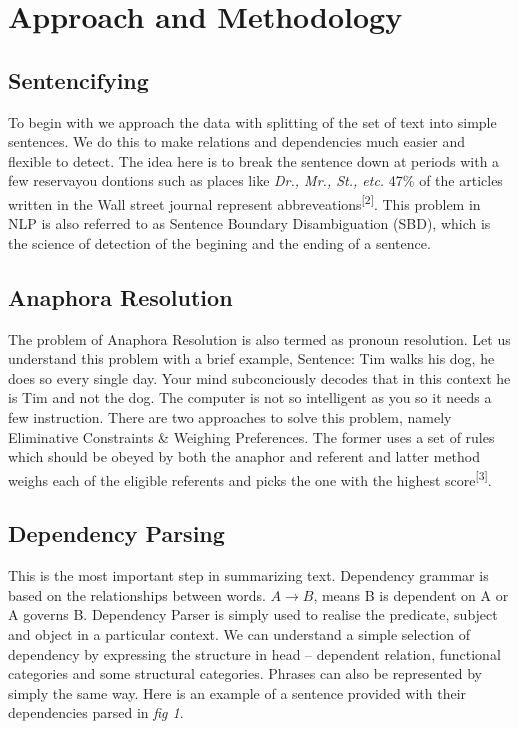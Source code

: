 \documentclass[conference]{IEEEtran}
\begin{document}
\section{Approach and Methodology}

\subsection{Sentencifying}
To begin with we approach the data with splitting of the set of text into simple sentences.
We do this to make relations and dependencies much easier and flexible to detect. The idea here is to break the sentence down at periods with a few reservayou dontions such as places like \textit{Dr., Mr., St., etc.} 47\% of the articles written in the Wall street journal represent abbreveations\textsuperscript{[2]}. This problem in NLP is also referred to as Sentence Boundary Disambiguation (SBD), which is the science of detection of the begining and the ending of a sentence.

\subsection{Anaphora Resolution}
The problem of Anaphora Resolution is also termed as pronoun resolution. Let us understand this problem with a brief example, Sentence: Tim walks his dog, he does so every single day. Your mind subconciously decodes that in this context he is Tim and not the dog. The computer is not so intelligent as you so it needs a few instruction. There are two approaches to solve this problem, namely Eliminative Constraints \& Weighing Preferences. The former uses a set of rules which should be obeyed by both the anaphor and referent and latter method weighs each of the eligible referents and picks the one with the highest score\textsuperscript{[3]}.

\subsection{Dependency Parsing}
This is the most important step in summarizing text. Dependency grammar is based on the relationships between words. $A \rightarrow B$, means B is dependent on A or A governs B. Dependency Parser is simply used to realise the predicate, subject and object in a particular context. We can understand a simple selection of dependency by expressing the structure in head -- dependent relation, functional categories and some structural categories. Phrases can also be represented by simply the same way. Here is an example of a sentence provided with their dependencies parsed in \textit{fig 1}.
\end{document}
